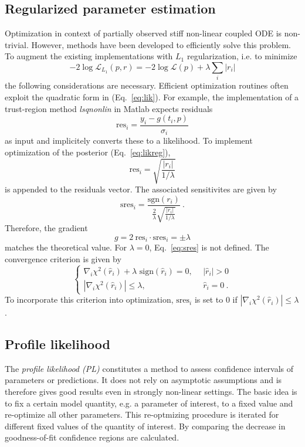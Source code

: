\documentclass{bioinfo}
\begin{document}
\subsection{Regularized parameter estimation}
Optimization in context of partially observed stiff non-linear coupled ODE is non-trivial.
However, methods have been developed to efficiently solve this problem.
To augment the existing implementations with $L_1$ regularization, i.e. to minimize
\begin{equation}
	-2\log \mathcal L_{L_1}(p,r) = -2\log \mathcal L(p) + \lambda \sum_i |r_i|
\end{equation}
the following considerations are necessary.
Efficient optimization routines often exploit the quadratic form in (Eq.~\ref{eq:lik}).
For example, the implementation of a trust-region method \textit{lsqnonlin} in Matlab expects residuals
\begin{equation}
	\text{res}_i = \frac{y_i-g(t_i,p)}{\sigma_i}
\end{equation}
as input and implicitely converts these to a likelihood.
To implement optimization of the posterior (Eq.~\ref{eq:likreg}),
\begin{equation}
	\text{res}_i = \sqrt{\frac{|r_i|}{1/\lambda}}
\end{equation}
is appended to the residuals vector.
The associated sensitivites are given by
\begin{equation}
	\text{sres}_i = \frac{\text{sgn}(r_i)}{\frac{2}{\lambda}\sqrt{\frac{|r_i|}{1/\lambda}}} \:.\label{eq:sres}
\end{equation}
Therefore, the gradient
\begin{equation}
	g = 2 \: \text{res}_i \cdot \text{sres}_i = \pm \lambda
\end{equation}
matches the theoretical value.
For $\lambda = 0$, Eq.~\ref{eq:sres} is not defined.
The convergence criterion is given by
\begin{equation}
	\begin{cases}
	\nabla_i \chi^2(\hat r_i) + \lambda \text{ sign}(\hat r_i) = 0, \:\:& |\hat r_i| > 0\\
	|\nabla_i \chi^2(\hat r_i)| \le \lambda, \:\:&\hat r_i = 0 \:.
	\end{cases}
\end{equation}
To incorporate this criterion into optimization, $\text{sres}_i$ is set to $0$ if $|\nabla_i \chi^2(\hat r_i)| \le \lambda$.\\

\subsection{Profile likelihood}
The \emph{profile likelihood (PL)} constitutes a method to assess confidence intervals of parameters or predictions.
It does not rely on asymptotic assumptions and is therefore gives good results even in strongly non-linear settings.
The basic idea is to fix a certain model quantity, e.g. a parameter of interest, to a fixed value and re-optimize all other parameters. %
This re-optmizing procedure is iterated for different fixed values of the quantity of interest.
By comparing the decrease in goodness-of-fit confidence regions are calculated.
\end{document}
